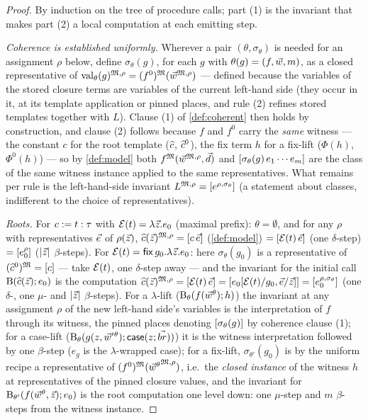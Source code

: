 \begin{proof}
By induction on the tree of procedure calls; part (1) is the invariant
that makes part (2) a local computation at each emitting step.

\emph{Coherence is established uniformly.}  Wherever a pair $(\theta,
\sigma_\theta)$ is needed for an assignment $\rho$ below, define
$\sigma_\theta(g)$, for each $g$ with $\theta(g) = (f, \vec{w}, m)$,
as a closed representative of $\mathrm{val}_{\theta}(g)^{\mathfrak{M},\rho} =
(f^0)^{\mathfrak{M}}(\vec{w}^{\mathfrak{M},\rho})$ --- defined because the variables of
the stored closure terms are variables of the current left-hand side
(they occur in it, at its template application or pinned places, and
rule (2) refines stored templates together with $L$).  Clause (1) of
\cref{def:coherent} then holds by construction, and clause (2)
follows because $f$ and $f^0$ carry the \emph{same} witness --- the
constant $c$ for the root template ($\widehat{c}$, $\widehat{c}^0$), the
fix term $h$ for a fix-lift ($\Phi(h)$, $\Phi^0(h)$) --- so by
\cref{def:model} both $f^{\mathfrak{M}}(\vec{w}^{\mathfrak{M},\rho}, \vec{d})$ and
$[\sigma_\theta(g)\,e_1 \cdots e_m]$ are the class of the same
witness instance applied to the same representatives.  What remains
per rule is the left-hand-side invariant $L^{\mathfrak{M},\rho} =
[e^{\rho,\sigma_\theta}]$ (a statement about classes, indifferent
to the choice of representatives).

\emph{Roots.}  For $c \mathrel{:=} t : \tau$ with $\mathcal{E}(t) = \lambda
\vec{z}.e_0$ (maximal prefix): $\theta = \emptyset$, and for any
$\rho$ with representatives $\vec{e}$ of $\rho(\vec{z})$,
$\widehat{c}(\vec{z})^{\mathfrak{M},\rho} = [c\,\vec{e}]$
(\cref{def:model}) $= [\mathcal{E}(t)\,\vec{e}]$ (one $\delta$-step)
$= [e_0^\rho]$ ($|\vec{z}|$ $\beta$-steps).  For $\mathcal{E}(t) =
\mathsf{fix}\,g_0.\lambda\vec{z}.e_0$: here $\sigma_\theta(g_0)$ is a
representative of $(\widehat{c}^0)^{\mathfrak{M}} = [c]$ --- take
$\mathcal{E}(t)$, one $\delta$-step away --- and the invariant for the
initial call $\mathrm{B}(\widehat{c}(\vec{z}); e_0)$ is the computation
$\widehat{c}(\vec{z})^{\mathfrak{M},\rho} = [\mathcal{E}(t)\,\vec{e}] =
[e_0[\mathcal{E}(t)/g_0, \vec{e}/\vec{z}]] =
[e_0^{\rho,\sigma_\theta}]$ (one $\delta$-, one $\mu$- and
$|\vec{z}|$ $\beta$-steps).  For a $\lambda$-lift
($\mathrm{B}_\theta(f(\vec{w}{}^{\theta}); h)$) the invariant at
any assignment $\rho$ of the new left-hand side's variables is the
interpretation of $f$ through its witness, the pinned places
denoting $[\sigma_\theta(g)]$ by coherence clause (1); for a
case-lift ($\mathrm{B}_\theta(g(z, \vec{w}'{}^{\theta});
\mathsf{case}(z;\vec{br}))$) it is the witness interpretation followed
by one $\beta$-step ($e_g$ is the $\lambda$-wrapped case); for a
fix-lift, $\sigma_{\theta'}(g_0)$ is by the uniform recipe a
representative of $(f^0)^{\mathfrak{M}}({\vec{w}{}^{\theta}}^{\mathfrak{M},\rho})$,
i.e.\ the \emph{closed instance} of the witness $h$ at
representatives of the pinned closure values, and the invariant for
$\mathrm{B}_{\theta'}(f(\vec{w}{}^{\theta}, \vec{z}); e_0)$ is
the root computation one level down: one $\mu$-step and $m$
$\beta$-steps from the witness instance.


\end{proof}
